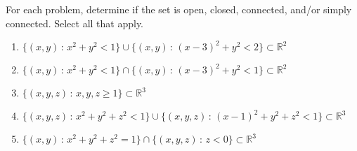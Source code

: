 \documentclass{ximera}
\begin{document}
\begin{problem}
For each problem, determine if the set is open, closed, connected, and/or simply connected. Select all that apply.
\begin{enumerate}
\item $\{(x,y)\,:\,x^2+y^2<1\}\cup\{(x,y)\,:\,(x-3)^2+y^2<2\}\subset \mathbb{R}^2$
\begin{selectAll}
  \end{selectAll}
\item $\{(x,y)\,:\,x^2+y^2<1\}\cap\{(x,y)\,:\,(x-3)^2+y^2<1\}\subset \mathbb{R}^2$
\begin{selectAll}
  \end{selectAll}
\item $\{(x,y,z)\,:\,x,y,z\geq 1\}\subset \mathbb{R}^3$
\begin{selectAll}
  \end{selectAll}
  \item $\{(x,y,z)\,:\,x^2+y^2+z^2<1\}\cup\{(x,y,z)\,:\,(x-1)^2+y^2+z^2<1\}\subset \mathbb{R}^3$
\begin{selectAll}
  \end{selectAll}
\item $\{(x,y)\,:\,x^2+y^2+z^2=1\}\cap\{(x,y,z)\,:\,z<0\}\subset \mathbb{R}^3$
\begin{selectAll}
  \end{selectAll}
\end{enumerate}
\end{problem}
\end{document}
